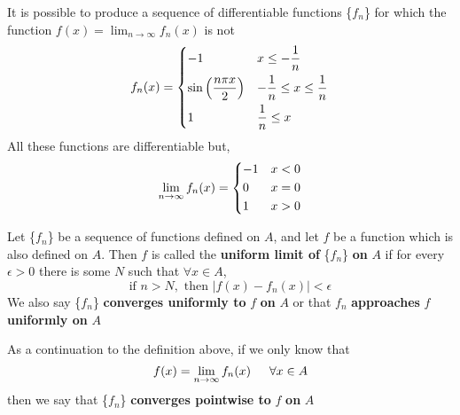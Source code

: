 \begin{ceg}
    It is possible to produce a sequence of differentiable functions
    \{$f_n$\} for which the function $f(x) =\lim_{n\to\infty}f_n(x)$ is not
    $$f_n(x) =
    \begin{dcases}
        -1 & x \leq -\frac{1}{n} \\
        \sin\left( \frac{n \pi x}{2} \right) & -\frac{1}{n} \leq x \leq \frac{1}{n} \\
        1  & \frac{1}{n}\leq x
    \end{dcases}$$
    All these functions are differentiable but, 
    $$\lim_{n\to\infty} f_n(x) =
    \begin{dcases}
        -1 & x<0 \\
        0 & x=0 \\
        1  & x > 0 
    \end{dcases}$$
\end{ceg} \bigskip

\begin{definition}
    Let \{$f_n$\} be a sequence of functions defined on $A$, and let $f$ be a function which is also defined on $A$. Then $f$ is called the \textbf{uniform limit of} \{$f_n$\} \textbf{on} $A$ if for every $\epsilon>0$ there is some $N$ such that $\forall x \in A$,
    $$\text{if } n > N, \text{ then } |f(x) -f_n(x)| < \epsilon$$
    We also say \{$f_n$\} \textbf{converges uniformly to} $f$ \textbf{on} $A$ or that $f_n$ \textbf{approaches} $f$ \textbf{uniformly on} $A$
\end{definition}
\begin{definition}
    As a continuation to the definition above, if we only know that
    $$f(x) = \lim_{n\to\infty}f_n(x) \indent \forall x\in A$$
    then we say that \{$f_n$\} \textbf{converges pointwise to} $f$ \textbf{on} $A$
\end{definition}

